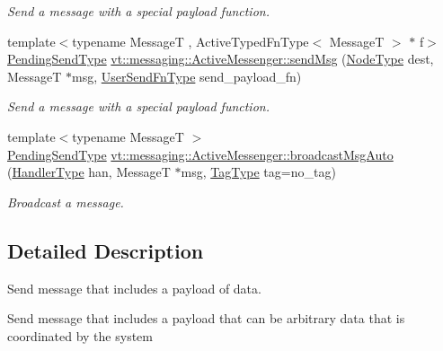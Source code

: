 \begin{DoxyCompactItemize}
\begin{DoxyCompactList}\small\item\em Send a message with a special payload function. \end{DoxyCompactList}\item 
{\footnotesize template$<$typename MessageT , Active\+Typed\+Fn\+Type$<$ Message\+T $>$ $\ast$ f$>$ }\\\hyperlink{structvt_1_1messaging_1_1_active_messenger_a3626a6ca76d8ad4ec7c3b47a2c70d3a8}{Pending\+Send\+Type} \hyperlink{group__sendpayload_ga3685dbcba2c7fcd75fdfd10b613684ad}{vt\+::messaging\+::\+Active\+Messenger\+::send\+Msg} (\hyperlink{namespacevt_a866da9d0efc19c0a1ce79e9e492f47e2}{Node\+Type} dest, MessageT $\ast$msg, \hyperlink{structvt_1_1messaging_1_1_active_messenger_a4b1993ad77436b6ed6c7fd32801c50ed}{User\+Send\+Fn\+Type} send\+\_\+payload\+\_\+fn)
\begin{DoxyCompactList}\small\item\em Send a message with a special payload function. \end{DoxyCompactList}\item 
{\footnotesize template$<$typename MessageT $>$ }\\\hyperlink{structvt_1_1messaging_1_1_active_messenger_a3626a6ca76d8ad4ec7c3b47a2c70d3a8}{Pending\+Send\+Type} \hyperlink{group__sendpayload_ga594e99da7cb1a02587b21646679b2936}{vt\+::messaging\+::\+Active\+Messenger\+::broadcast\+Msg\+Auto} (\hyperlink{namespacevt_af64846b57dfcaf104da3ef6967917573}{Handler\+Type} han, MessageT $\ast$msg, \hyperlink{namespacevt_a84ab281dae04a52a4b243d6bf62d0e52}{Tag\+Type} tag=no\+\_\+tag)
\begin{DoxyCompactList}\small\item\em Broadcast a message. \end{DoxyCompactList}\end{DoxyCompactItemize}


\subsection{Detailed Description}
Send message that includes a payload of data. 

Send message that includes a payload that can be arbitrary data that is coordinated by the system


